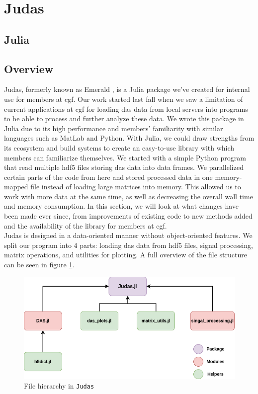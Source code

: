 \section{Judas}
\label{met:Judas}

\subsection{Julia}

\subsection{Overview}

Judas, formerly known as Emerald \cite{projthesis}, is a Julia package we've created for internal use for members at \acrshort{cgf}. Our work started last fall when we saw a limitation of current applications at \acrshort{cgf} for loading \acrshort{das} data from local servers into programs to be able to process and further analyze these data. We wrote this package in Julia due to its high performance and members' familiarity with similar languages such as MatLab and Python. With Julia, we could draw strengths from its ecosystem and build systems to create an easy-to-use library with which members can familiarize themselves. We started with a simple Python program that read multiple \acrshort{hdf5} files storing \acrshort{das} data into data frames. We parallelized certain parts of the code from here and stored processed data in one memory-mapped file instead of loading large matrices into memory. This allowed us to work with more data at the same time, as well as decreasing the overall wall time and memory consumption.  
In this section, we will look at what changes have been made ever since, from improvements of existing code to new methods added and the availability of the library for members at \acrshort{cgf}. \\
Judas is designed in a data-oriented manner without object-oriented features. We split our program into 4 parts: loading \acrshort{das} data from \acrshort{hdf5} files, signal processing, matrix operations, and utilities for plotting. A full overview of the file structure can be seen in figure \ref{fig:judasoverview}.\\

\begin{figure}[!h]
    \centering
    \includegraphics[scale=.5]{figures/judas_overview.png}
    \caption{File hierarchy in \texttt{Judas}}
    \label{fig:judasoverview}
\end{figure}

